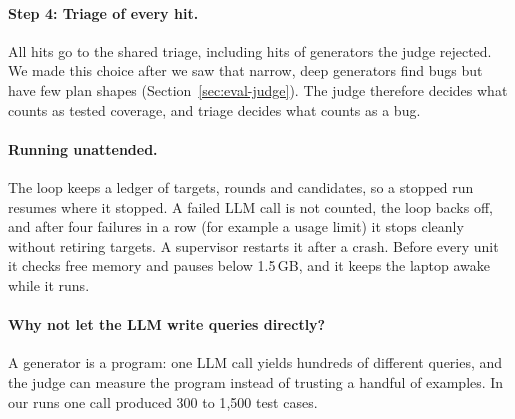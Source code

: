 \paragraph{Step 4: Triage of every hit.} All hits go to the shared triage, including hits of generators the judge
rejected. We made this choice after we saw that narrow, deep generators find bugs but have few plan shapes
(Section~\ref{sec:eval-judge}). The judge therefore decides what counts as tested coverage, and triage decides what
counts as a bug.

\paragraph{Running unattended.} The loop keeps a ledger of targets, rounds and candidates, so a stopped run resumes
where it stopped. A failed LLM call is not counted, the loop backs off, and after four failures in a row (for example a
usage limit) it stops cleanly without retiring targets. A supervisor restarts it after a crash. Before every unit it
checks free memory and pauses below 1.5\,GB, and it keeps the laptop awake while it runs.

\paragraph{Why not let the LLM write queries directly?} A generator is a program: one LLM call yields hundreds of
different queries, and the judge can measure the program instead of trusting a handful of examples. In our runs one call
produced 300 to 1{,}500 test cases.

